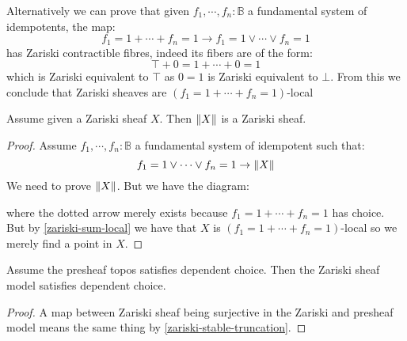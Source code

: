 \begin{remark}
Alternatively we can prove that given $f_1,\cdots,f_n:\mathbb{B}$ a fundamental system of idempotents, the map:
\[f_1=1+\cdots + f_n=1 \to f_1=1\lor\cdots\lor f_n=1\]
has Zariski contractible fibres, indeed its fibers are of the form:
\[\top + 0=1 + \cdots + 0=1\]
which is Zariski equivalent to $\top$ as $0=1$ is Zariski equivalent to $\bot$. From this we conclude that Zariski sheaves are $(f_1=1+\cdots + f_n=1)$-local
\end{remark}

\begin{lemma}\label{zariski-stable-truncation}
Assume given a Zariski sheaf $X$. Then $\lVert X \rVert$ is a Zariski sheaf.
\end{lemma}

\begin{proof}
Assume $f_1,\cdots,f_n:\mathbb{B}$ a fundamental system of idempotent such that:
\[f_1=1\lor\cdots\lor f_n=1 \to \lVert X \rVert\]
We need to prove $\lVert X \rVert$. But we have the diagram:
 \begin{center}
  \end{center}
  where the dotted arrow merely exists because $f_1=1+ \cdots + f_n=1$ has choice. But by \cref{zariski-sum-local} we have that $X$ is $(f_1=1+\cdots + f_n=1)$-local so we merely find a point in $X$.
\end{proof}

\begin{proposition}
Assume the presheaf topos satisfies dependent choice. Then the Zariski sheaf model satisfies dependent choice.
\end{proposition}

\begin{proof}
A map between Zariski sheaf being surjective in the Zariski and presheaf model means the same thing by \cref{zariski-stable-truncation}.
\end{proof}

